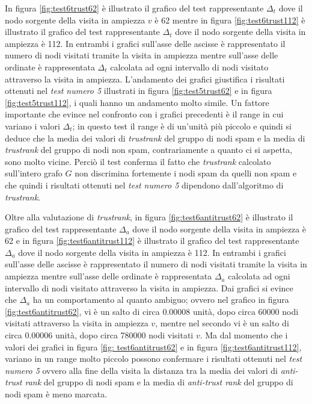 In figura \ref{fig:test6trust62} è illustrato il grafico del test rappresentante \(\Delta_t\) dove il nodo sorgente della visita in ampiezza \(v\) è 62 mentre in figura \ref{fig:test6trust112} è illustrato il grafico del test rappresentante \(\Delta_t\) dove il nodo sorgente della visita in ampiezza è 112. In entrambi i grafici sull'asse delle ascisse è rappresentato il numero di nodi visitati tramite la visita in ampiezza mentre sull'asse delle ordinate è rappresentata \(\Delta_t\) calcolata ad ogni intervallo di nodi visitato attraverso la visita in ampiezza. L'andamento dei grafici giustifica i risultati ottenuti nel \textit{test numero 5} illustrati in figura \ref{fig:test5trust62} e in figura \ref{fig:test5trust112}, i quali hanno un andamento molto simile. Un fattore importante che evince nel confronto con i grafici precedenti è il range in cui variano i valori \(\Delta_t\); in questo test il range è di un'unità più piccolo e quindi si deduce che la media dei valori di \textit{trustrank} del gruppo di 
nodi 
spam e la media di \textit{trustrank} del gruppo di nodi non spam, contrariamente a quanto ci si aspetta, sono molto vicine. Perciò il test conferma il fatto che \textit{trustrank} calcolato sull'intero grafo \(G\) non discrimina fortemente i nodi spam da quelli non spam e che quindi i risultati ottenuti nel \textit{test numero 5} dipendono dall'algoritmo di \textit{trustrank}.
 
Oltre alla valutazione di \textit{trustrank}, in figura \ref{fig:test6antitrust62}  è illustrato il grafico del test rappresentante \(\Delta_a\) dove il nodo sorgente della visita in ampiezza è 62 e in figura \ref{fig:test6antitrust112} è illustrato il grafico del test rappresentante \(\Delta_a\) dove il nodo sorgente della visita in ampiezza è 112. In entrambi i grafici sull'asse delle ascisse è rappresentato il numero di nodi visitati tramite la visita in ampiezza mentre sull'asse delle ordinate è rappresentata \(\Delta_a\) calcolata ad ogni intervallo di nodi visitato attraverso la visita in ampiezza. Dai grafici si evince che  \(\Delta_a\)  ha un comportamento al quanto ambiguo; ovvero nel grafico in figura \ref{fig:test6antitrust62}, vi è un salto di circa 0.00008 unità, dopo circa 60000 nodi visitati attraverso la visita in ampiezza \(v\), mentre nel secondo vi è un salto di circa 0.00006 unità, dopo circa 780000 nodi visitati \(v\). Ma dal momento che i  valori dei grafici in figura \ref{fig:
test6antitrust62} 
e in figura \ref{fig:test6antitrust112}, variano in un range molto piccolo possono confermare i risultati ottenuti nel \textit{test numero 5}  ovvero alla fine della visita la distanza tra la media dei valori di \textit{anti-trust rank} del gruppo di nodi spam e la media di \textit{anti-trust rank} del gruppo di nodi spam è meno marcata.

